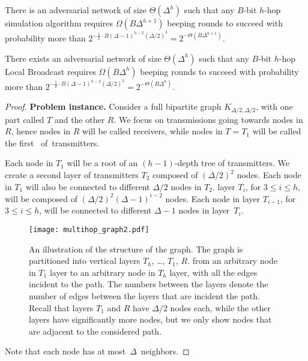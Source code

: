 \begin{theorem}\label{thm:multihoplb}
    There 
    is
    an adversarial network of size $\Theta(\Delta^h)$ such that any $B$-bit $h$-hop simulation algorithm requires $\Omega(B\Delta^{h+1})$ beeping rounds to succeed with probability more than $2^{-\frac{1}{2}\cdot B(\Delta-1)^{h-2}(\Delta/2)^3} = 2^{-\Theta\left(B\Delta^{h+1}\right)}$.

    There exists an adversarial network of size $\Theta(\Delta^h)$ such that any $B$-bit $h$-hop Local Broadcast requires $\Omega(B\Delta^{h})$ beeping rounds to succeed with probability more than $2^{-\frac{1}{2}\cdot B(\Delta-1)^{h-2}(\Delta/2)^2} = 2^{-\Theta\left(B\Delta^{h}\right)}$.
\end{theorem}
\begin{proof}
    \noindent\textbf{Problem instance.}
    Consider a full bipartite graph $K_{\Delta/2,\Delta/2}$, with one part called $T$ and the other $R$. We 
    focus on transmissions going towards nodes in $R$, hence nodes in $R$ will be called receivers, while nodes in $T = T_1$ will be called the first ~of~transmitters. 
    
    Each node in $T_1$ will be a root of an $(h-1)$-depth tree of transmitters. We create a second layer of transmitters $T_2$ composed of $(\Delta/2)^2$ nodes. Each node in $T_1$  will also be connected to different $\Delta/2$ nodes in $T_2$.
     layer $T_i$, for $3 \leq i \leq h$, will be composed of $(\Delta/2)^2 (\Delta-1)^{i-2}$ nodes. Each node in layer $T_{i-1}$, for $3 \leq i \leq h$, will be connected to different $\Delta-1$ nodes in layer~$T_i$. 
%
    \begin{figure}[t]
        \centering
        \texttt{[image: multihop\_graph2.pdf]}
        \caption{An illustration of the structure of the graph. The graph is partitioned into vertical layers $T_h$, \dots, $T_1$, $R$.  from an arbitrary node in $T_1$ layer to an arbitrary node in $T_h$ layer, with all the edges incident to the path. The numbers between the layers denote the number of edges between the layers that are incident  the path. Recall that layers $T_1$ and $R$ have $\Delta/2$ nodes each, while the other layers have significantly more nodes, but we only show nodes that are adjacent to the considered path.}
        \label{fig:multihop_graph}
    \end{figure}
%    
    Note that each node  has at most~$\Delta$~neighbors.


\end{proof}
